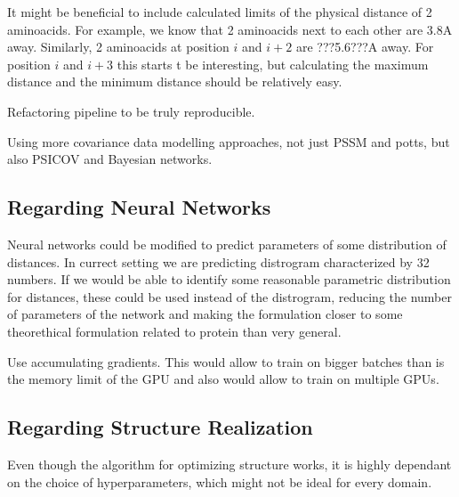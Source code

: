 It might be beneficial to include calculated limits of the physical distance of 2 aminoacids.
For example, we know that 2 aminoacids next to each other are 3.8A away.
Similarly, 2 aminoacids at position $i$ and $i+2$ are ???5.6???A away.
For position $i$ and $i+3$ this starts t be interesting, but calculating the maximum distance and the minimum distance should be relatively easy.

Refactoring pipeline to be truly reproducible.

Using more covariance data modelling approaches, not just PSSM and potts, but also PSICOV and Bayesian networks.

\subsection{Regarding Neural Networks}
Neural networks could be modified to predict parameters of some distribution of distances.
In currect setting we are predicting distrogram characterized by 32 numbers.
If we would be able to identify some reasonable parametric distribution for distances, these could be used instead of the distrogram, reducing the number of parameters of the network and making the formulation closer to some theorethical formulation related to protein than very general.

Use accumulating gradients. This would allow to train on bigger batches than is the memory limit of the GPU and also would allow to train on multiple GPUs.

\subsection{Regarding Structure Realization}

Even though the algorithm for optimizing structure works, it is highly dependant on the choice of hyperparameters, which might not be ideal for every domain. 